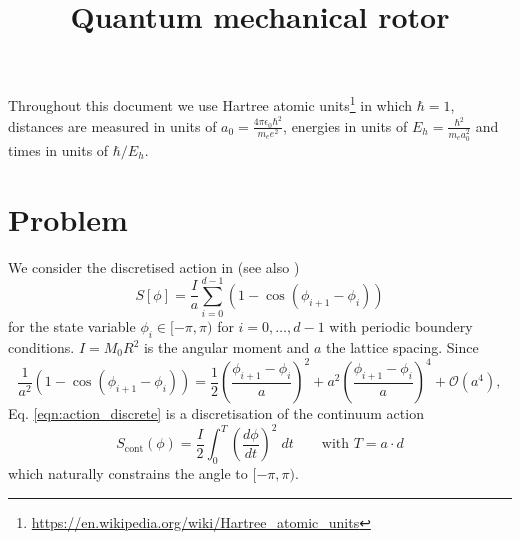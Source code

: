 \documentclass[11pt]{article}
\title{Quantum mechanical rotor}
\begin{document}
\maketitle
Throughout this document we use Hartree atomic units\footnote{\url{https://en.wikipedia.org/wiki/Hartree_atomic_units}} in which $\hbar=1$, distances are measured in units of $a_0=\frac{4\pi\epsilon_0\hbar^2}{m_e e^2}$, energies in units of $E_h=\frac{\hbar^2}{m_ea_0^2}$ and times in units of $\hbar/E_h$.
\section{Problem}
We consider the discretised action in \cite{Ammon2016} (see also \cite{Bietenholz1997})
\begin{equation}
S[\phi] = \frac{I}{a}\sum_{i=0}^{d-1} \left(
1-\cos(\phi_{i+1}-\phi_i)
\right)\label{eqn:action_discrete}
\end{equation}
for the state variable $\phi_i\in[-\pi,\pi)$ for $i=0,\dots,d-1$ with periodic boundery conditions. $I=M_0R^2$ is the angular moment and $a$ the lattice spacing. Since
\begin{equation}
\frac{1}{a^2}\left(1-\cos(\phi_{i+1}-\phi_i)\right) =
\frac{1}{2}\left(\frac{\phi_{i+1}-\phi_i}{a}\right)^2 + a^2 \left(
\frac{\phi_{i+1}-\phi_i}{a}\right)^4 + \mathcal{O}(a^4),
\end{equation}
Eq. \eqref{eqn:action_discrete} is a discretisation of the continuum action
\begin{equation*}
S_{\text{cont}}(\phi) = \frac{I}{2}\int_{0}^{T} \left(\frac{d\phi}{dt}\right)^2\;dt\qquad\text{with $T=a\cdot d$}
\end{equation*}
which naturally constrains the angle to $[-\pi,\pi)$.
\end{document}
